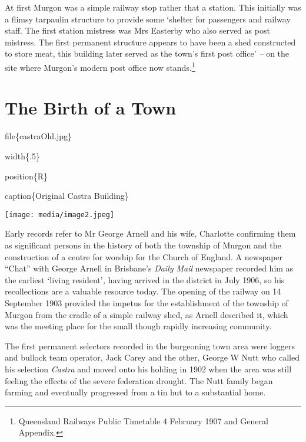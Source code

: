 At first Murgon was a simple railway stop rather that a station. This
initially was a flimsy tarpaulin structure to provide some `shelter for
passengers and railway staff. The first station mistress was Mrs
Easterby who also served as post mistress. The first permanent structure
appears to have been a shed constructed to store meat, this building
later served as the town's first post office' \emph{--} on the site
where Murgon's modern post office now stands.\footnote{Queensland
  Railways Public Timetable 4 February 1907 and General Appendix.}

\hypertarget{the-birth-of-a-town}{%
\chapter{The Birth of a Town}\label{the-birth-of-a-town}}

file\{castraOld.jpg\}

width\{.5\}

position\{R\}

caption\{Original Castra Building\}

\texttt{[image: media/image2.jpeg]}

Early records refer to Mr George Arnell and his wife, Charlotte
confirming them as significant persons in the history of both the
township of Murgon and the construction of a centre for worship for the
Church of England. A newspaper ``Chat'' with George Arnell in Brisbane's
\emph{Daily Mail} newspaper recorded him as the earliest `living
resident'\emph{,} having arrived in the district in July 1906, so his
recollections are a valuable resource today. The opening of the railway
on 14 September 1903 provided the impetus for the establishment of the
township of Murgon from the cradle of a simple railway shed, as Arnell
described it, which was the meeting place for the small though rapidly
increasing community.

The first permanent selectors recorded in the burgeoning town area were
loggers and bullock team operator, Jack Carey and the other, George W
Nutt who called his selection \emph{Castra} and moved onto his holding
in 1902 when the area was still feeling the effects of the severe
federation drought. The Nutt family began farming and eventually
progressed from a tin hut to a substantial home.

